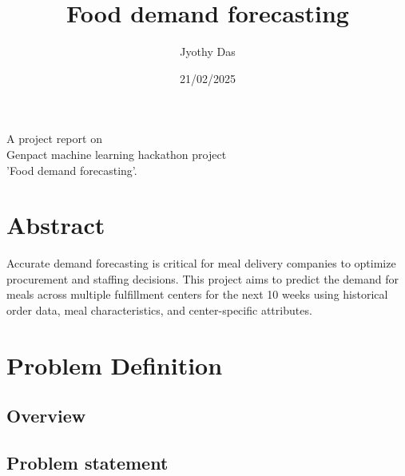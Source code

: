 \documentclass[12pt]{article}
\begin{document}
\title{Food demand forecasting}

\author{ Jyothy Das}
\date{21/02/2025}
\maketitle

\vspace{30pt}
\begin{center}
A project report on\\
Genpact machine learning hackathon project\\
'Food demand forecasting'.\\
\end{center}

\vspace{20pt}


\tableofcontents
\listoffigures
\listoftables

\newpage
\section{Abstract}
Accurate demand forecasting is critical for meal delivery companies to optimize procurement and staffing decisions. This project aims to predict the demand for meals across multiple fulfillment centers for the next 10 weeks using historical order data, meal characteristics, and center-specific attributes. 
\section{Problem Definition}
\subsection{Overview }

\subsection{Problem statement}
\end{document}
